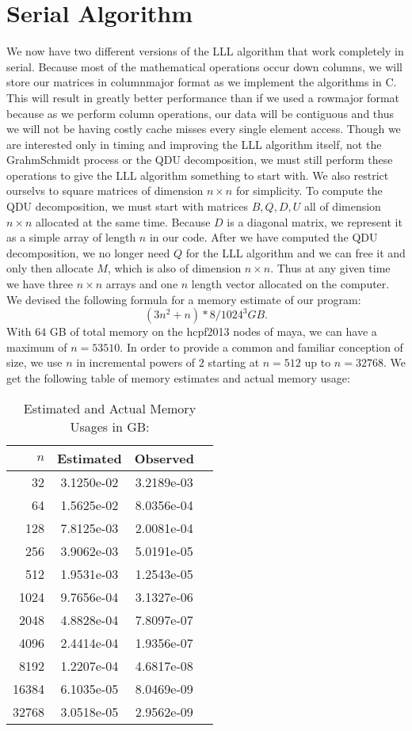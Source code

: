 \documentclass[12pt]{article}
\numberwithin{equation}{section}
\numberwithin{table}{section}
\numberwithin{figure}{section}
\begin{document}
\section{Serial Algorithm}
We now have two different versions of the LLL algorithm that work completely in serial. Because most of the mathematical operations occur down columns, we will store our matrices in column\-major format as we implement the algorithms in C. This will result in greatly better performance than if we used a row\-major format because as we perform column operations, our data will be contiguous and thus we will not be having costly cache misses every single element access. Though we are interested only in timing and improving the LLL algorithm itself, not the Grahm\-Schmidt process or the QDU decomposition, we must still perform these operations to give the LLL algorithm something to start with. We also restrict ourselvs to square matrices of dimension $n \times n$ for simplicity. To compute the QDU decomposition, we must start with matrices $B,Q,D,U$ all of dimension $n \times n$ allocated at the same time. Because $D$ is a diagonal matrix, we represent it as a simple array of length $n$ in our code. After we have computed the QDU decomposition, we no longer need $Q$ for the LLL algorithm and we can free it and only then allocate $M$, which is also of dimension $n \times n$. Thus at any given time we have three $n \times n$ arrays and one $n$ length vector allocated on the computer. We devised the following formula for a memory estimate of our program:
$$(3n^2 + n) * 8 / 1024^3 GB.$$
With $64$ GB of total memory on the hcpf2013 nodes of maya, we can have a maximum of $n=53510$. In order to provide a common and familiar conception of size, we use $n$ in incremental powers of $2$ starting at $n=512$ up to $n=32768$. We get the following table of memory estimates and actual memory usage:
\begin{table} \centering
  \caption{Estimated and Actual Memory Usages in GB:}
  \label{memusage}
  \vspace{0.5\baselineskip}
  \begin{tabular}{rccc}
    \hline
    $n$ & Estimated & Observed\\
    \hline
       32 &   3.1250e-02 & 3.2189e-03 \\
       64 &   1.5625e-02 & 8.0356e-04 \\
      128 &   7.8125e-03 & 2.0081e-04 \\
      256 &   3.9062e-03 & 5.0191e-05 \\
      512 &   1.9531e-03 & 1.2543e-05 \\
     1024 &   9.7656e-04 & 3.1327e-06 \\
     2048 &   4.8828e-04 & 7.8097e-07 \\
     4096 &   2.4414e-04 & 1.9356e-07 \\
     8192 &   1.2207e-04 & 4.6817e-08 \\
    16384 &   6.1035e-05 & 8.0469e-09 \\
    32768 &   3.0518e-05 & 2.9562e-09 \\
    \hline
  \end{tabular}
\end{table}
\pagebreak

\end{document}
